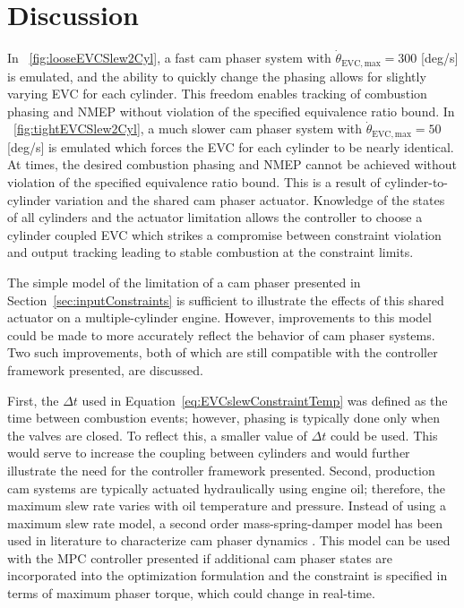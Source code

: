 \section{Discussion}
In \figurename~\ref{fig:looseEVCSlew2Cyl}, a fast cam phaser system with $\dot{\theta}_{\mathrm{EVC,max}} = 300$ [deg/s] is emulated, and the ability to quickly change the phasing allows for slightly varying EVC for each cylinder. This freedom enables tracking of combustion phasing and NMEP without violation of the specified equivalence ratio bound. In \figurename~\ref{fig:tightEVCSlew2Cyl}, a much slower cam phaser system with $\dot{\theta}_{\mathrm{EVC,max}} = 50$ [deg/s] is emulated which forces the EVC for each cylinder to be nearly identical. At times, the desired combustion phasing and NMEP cannot be achieved without violation of the specified equivalence ratio bound. This is a result of cylinder-to-cylinder variation and the shared cam phaser actuator. Knowledge of the states of all cylinders and the actuator limitation allows the controller to choose a cylinder coupled EVC which strikes a compromise between constraint violation and output tracking leading to stable combustion at the constraint limits.

The simple model of the limitation of a cam phaser presented in Section~\ref{sec:inputConstraints} is sufficient to illustrate the effects of this shared actuator on a multiple-cylinder engine. However, improvements to this model could be made to more accurately reflect the behavior of cam phaser systems. Two such improvements, both of which are still compatible with the controller framework presented, are discussed.

First, the $\Delta t$ used in Equation~\ref{eq:EVCslewConstraintTemp} was defined as the time between combustion events; however, phasing is typically done only when the valves are closed. To reflect this, a smaller value of $\Delta t$ could be used. This would serve to increase the coupling between cylinders and would further illustrate the need for the controller framework presented.
Second, production cam systems are typically actuated hydraulically using engine oil; therefore, the maximum slew rate varies with oil temperature and pressure. Instead of using a maximum slew rate model, a second order mass-spring-damper model has been used in literature to characterize cam phaser dynamics \cite{Sinnamon2007}. This model can be used with the MPC controller presented if additional cam phaser states are incorporated into the optimization formulation and the constraint is specified in terms of maximum phaser torque, which could change in real-time.


